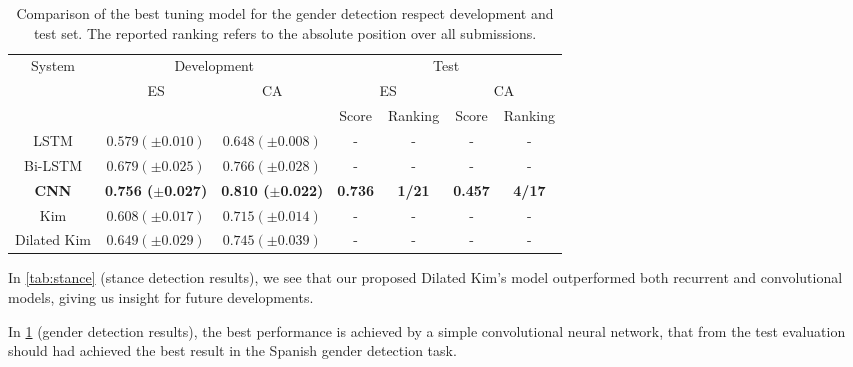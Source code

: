 \begin{table}[h]
	\footnotesize
	\caption{Comparison of the best tuning model for the gender detection respect development and test set. The reported ranking refers to the absolute position over all submissions.}
	\label{tab:gender}
	\centering
	\begin{tabular}{c|cc|cc|cc}
		\toprule
		\hline
		\multirow{3}{*}{System}	& \multicolumn{2}{c|}{Development} & \multicolumn{4}{c}{Test}	\\
		\cline{2-7}
		& \multirow{2}{*}{ES}	& \multirow{2}{*}{CA}	& \multicolumn{2}{c|}{ES} & \multicolumn{2}{c}{CA}	\\
		\cline{4-7}
		&		&		& Score & Ranking & Score & Ranking \\
		\hline
		LSTM					& $0.579 (\pm0.010)$ & $0.648 (\pm0.008)$ & - & - & - & - \\
		Bi-LSTM					& $0.679 (\pm0.025)$ & $0.766 (\pm0.028)$ & - & - & - & - \\
		\textbf{CNN}			& \textbf{0.756 ($\pm$0.027)} & \textbf{0.810 ($\pm$0.022)} & \textbf{0.736} & \textbf{1/21} & \textbf{0.457} & \textbf{4/17} \\
		Kim						& $0.608 (\pm0.017)$ & $0.715 (\pm0.014)$ & - & - & - & - \\
		Dilated Kim				& $0.649 (\pm0.029)$ & $0.745 (\pm0.039)$ & - & - & - & - \\
		\hline
		\bottomrule
	\end{tabular}
\end{table}

In \cref{tab:stance} (stance detection results), we see that our proposed Dilated Kim's model outperformed both recurrent and convolutional models, giving us insight for future developments.

In \cref{tab:gender} (gender detection results), the best performance is achieved by a simple convolutional neural network, that from the test evaluation should had achieved the best result in the Spanish gender detection task.